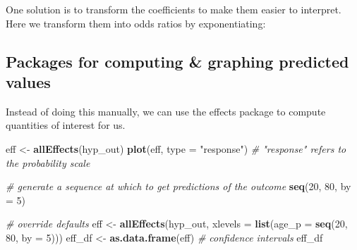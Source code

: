 \documentclass[]{book}
\newenvironment{Shaded}{\begin{snugshade}}{\end{snugshade}}
\newcommand{\KeywordTok}[1]{\textcolor[rgb]{0.13,0.29,0.53}{\textbf{#1}}}
\newcommand{\DataTypeTok}[1]{\textcolor[rgb]{0.13,0.29,0.53}{#1}}
\newcommand{\DecValTok}[1]{\textcolor[rgb]{0.00,0.00,0.81}{#1}}
\newcommand{\StringTok}[1]{\textcolor[rgb]{0.31,0.60,0.02}{#1}}
\newcommand{\CommentTok}[1]{\textcolor[rgb]{0.56,0.35,0.01}{\textit{#1}}}
\newcommand{\OperatorTok}[1]{\textcolor[rgb]{0.81,0.36,0.00}{\textbf{#1}}}
\newcommand{\NormalTok}[1]{#1}
\begin{document}
One solution is to transform the coefficients to make them easier to
interpret. Here we transform them into odds ratios by exponentiating:

\begin{Shaded}
\end{Shaded}

\subsection{Packages for computing \& graphing predicted
values}\label{packages-for-computing-graphing-predicted-values}

Instead of doing this manually, we can use the effects package to
compute quantities of interest for us.

\begin{Shaded}
\begin{Highlighting}[]
\NormalTok{  eff <-}\StringTok{ }\KeywordTok{allEffects}\NormalTok{(hyp_out)}
  \KeywordTok{plot}\NormalTok{(eff, }\DataTypeTok{type =} \StringTok{"response"}\NormalTok{) }\CommentTok{# "response" refers to the probability scale}

  \CommentTok{# generate a sequence at which to get predictions of the outcome}
  \KeywordTok{seq}\NormalTok{(}\DecValTok{20}\NormalTok{, }\DecValTok{80}\NormalTok{, }\DataTypeTok{by =} \DecValTok{5}\NormalTok{)}

  \CommentTok{# override defaults}
\NormalTok{  eff <-}\StringTok{ }\KeywordTok{allEffects}\NormalTok{(hyp_out, }\DataTypeTok{xlevels =} \KeywordTok{list}\NormalTok{(}\DataTypeTok{age_p =} \KeywordTok{seq}\NormalTok{(}\DecValTok{20}\NormalTok{, }\DecValTok{80}\NormalTok{, }\DataTypeTok{by =} \DecValTok{5}\NormalTok{)))}
\NormalTok{  eff_df <-}\StringTok{ }\KeywordTok{as.data.frame}\NormalTok{(eff) }\CommentTok{# confidence intervals}
\NormalTok{  eff_df}
\end{Highlighting}
\end{Shaded}
\end{document}

